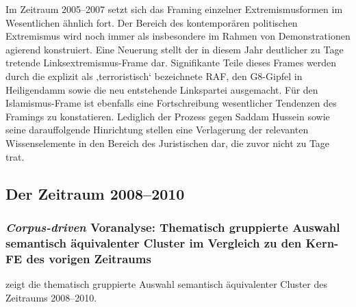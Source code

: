 Im Zeitraum 2005--2007 setzt sich das Framing einzelner Extremismusformen im Wesentlichen ähnlich fort. Der Bereich des kontemporären politischen Extremismus wird noch immer als insbesondere im Rahmen von Demonstrationen agierend konstruiert. Eine Neuerung stellt der in diesem Jahr deutlicher zu Tage tretende Linksextremismus-Frame dar. Signifikante Teile dieses Frames werden durch die explizit als ‚terroristisch` bezeichnete RAF, den G8-Gipfel in Heiligendamm sowie die neu entstehende Linkspartei ausgemacht. Für den Islamismus-Frame ist ebenfalls eine Fortschreibung wesentlicher Tendenzen des Framings zu konstatieren. Lediglich der Prozess gegen Saddam Hussein sowie seine darauffolgende Hinrichtung stellen eine Verlagerung der relevanten Wissenselemente in den Bereich des Juristischen dar, die zuvor nicht zu Tage trat.

\largerpage
\subsection{Der Zeitraum 2008--2010}\label{der-zeitraum-2008-2010}

\subsubsection{\texorpdfstring{\emph{Corpus-driven} Voranalyse: Thematisch gruppierte Auswahl semantisch äquivalenter Cluster im Vergleich zu den Kern-FE des vorigen Zeitraums}{Corpus-driven Voranalyse: Thematisch gruppierte Auswahl semantisch äquivalenter Cluster im Vergleich zu den Kern-FE des vorigen Zeitraums}}\label{corpus-driven-voranalyse-thematisch-gruppierte-auswahl-semantisch-aequivalenter-cluster-im-vergleich-zu-den-kern-fe-des-vorigen-zeitraums-2}

 zeigt die thematisch gruppierte Auswahl semantisch äquivalenter Cluster des Zeitraums 2008--2010.


